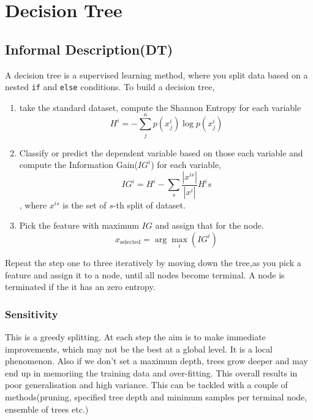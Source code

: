 \documentclass{article}
\begin{document}
\section{Decision Tree}
\subsection{Informal Description(DT)}
A decision tree is a supervised learning method, where you split data based 
on a nested \texttt{if} and \texttt{else} conditions. To build a decision tree, 
\begin{enumerate}
    \item take the standard dataset, compute the Shannon Entropy for each variable 
        \[H^i = -\sum_j^n p(x^i_j)\log p(x^i_j)\]
    \item Classify or predict the dependent variable based on those each variable and compute 
    the Information Gain($IG^i$) for each variable,
    \[ IG^i = H^i - \sum_s \frac{|x^{is}|}{|x^{i}|} H^is \], where $x^{is}$ is the set of
    $s$-th split of dataset. 
    \item Pick the feature with maximum $IG$ and assign that for the node. 
    \[x_{\text{selected}} = \arg \max_{i} (IG^i)\]
\end{enumerate}
Repeat the step one to three iteratively by moving down the tree,as you pick a feature and 
assign it to a node, until all nodes become terminal. A node is terminated if the it has an 
zero entropy. 

\subsubsection{Sensitivity}
This is a greedy splitting. At each step the aim is to make immediate improvements, which may 
not be the best at  a global level. It is a local phenomenon. Also if we don't set a maximum 
depth, trees grow deeper and may end up in memoriing the training data and over-fitting. This 
overall results in poor generalisation and high variance. This can be tackled with a couple of 
methods(pruning, specified tree depth and minimum samples per terminal node, ensemble of trees 
etc.)
\end{document}
